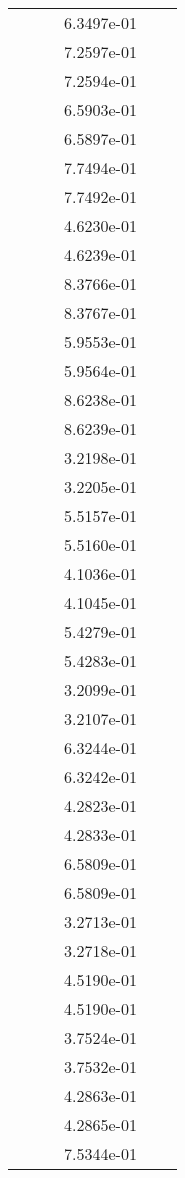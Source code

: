 \begin{xltabular}{\textwidth}{r|rS[table-format=1.3e+2]S[table-format=1.4e+2]S[table-format=1.4e+2]S[table-format=-1.5]}
&  &  & 6.3497e-01 & & \\
&  &  & 7.2597e-01 & & \\
&  &  & 7.2594e-01 & & \\
&  &  & 6.5903e-01 & & \\
&  &  & 6.5897e-01 & & \\
&  &  & 7.7494e-01 & & \\
&  &  & 7.7492e-01 & & \\
&  &  & 4.6230e-01 & & \\
&  &  & 4.6239e-01 & & \\
&  &  & 8.3766e-01 & & \\
&  &  & 8.3767e-01 & & \\
&  &  & 5.9553e-01 & & \\
&  &  & 5.9564e-01 & & \\
&  &  & 8.6238e-01 & & \\
&  &  & 8.6239e-01 & & \\
&  &  & 3.2198e-01 & & \\
&  &  & 3.2205e-01 & & \\
&  &  & 5.5157e-01 & & \\
&  &  & 5.5160e-01 & & \\
&  &  & 4.1036e-01 & & \\
&  &  & 4.1045e-01 & & \\
&  &  & 5.4279e-01 & & \\
&  &  & 5.4283e-01 & & \\
&  &  & 3.2099e-01 & & \\
&  &  & 3.2107e-01 & & \\
&  &  & 6.3244e-01 & & \\
&  &  & 6.3242e-01 & & \\
&  &  & 4.2823e-01 & & \\
&  &  & 4.2833e-01 & & \\
&  &  & 6.5809e-01 & & \\
&  &  & 6.5809e-01 & & \\
&  &  & 3.2713e-01 & & \\
&  &  & 3.2718e-01 & & \\
&  &  & 4.5190e-01 & & \\
&  &  & 4.5190e-01 & & \\
&  &  & 3.7524e-01 & & \\
&  &  & 3.7532e-01 & & \\
&  &  & 4.2863e-01 & & \\
&  &  & 4.2865e-01 & & \\
&  &  & 7.5344e-01 & & \\

\end{xltabular}
